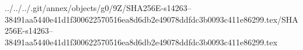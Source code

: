 ../../../.git/annex/objects/g0/9Z/SHA256E-s14263--38491aa5440e41d1f300622570516ea8d6db2e49078ddfdc3b0093c411e86299.tex/SHA256E-s14263--38491aa5440e41d1f300622570516ea8d6db2e49078ddfdc3b0093c411e86299.tex